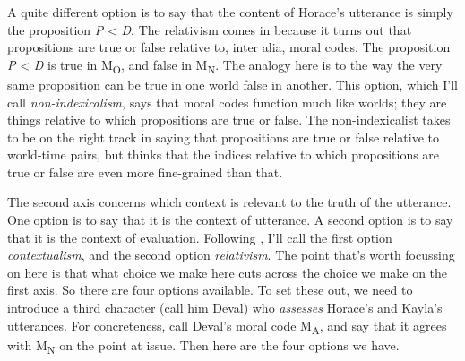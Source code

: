 A quite different option is to say that the content of Horace's utterance is simply the proposition \textit{P }{\textless}\textit{ D}. The relativism comes in because it turns out that propositions are true or false relative to, inter alia, moral codes. The proposition \textit{P }{\textless}\textit{ D} is true in M\textsubscript{O}, and false in M\textsubscript{N}. The analogy here is to the way the very same proposition can be true in one world false in another. This option, which I'll call \textit{non-indexicalism}, says that moral codes function much like worlds; they are things relative to which propositions are true or false. The non-indexicalist takes \cite{Kaplan1989} to be on the right track in saying that propositions are true or false relative to world-time pairs, but thinks that the indices relative to which propositions are true or false are even more fine-grained than that.

The second axis concerns which context is relevant to the truth of the utterance. One option is to say that it is the context of utterance. A second option is to say that it is the context of evaluation. Following \cite{MacFarlane2007-SMNIC, MacFarlane2009-MACNC}, I'll call the first option \textit{contextualism}, and the second option \textit{relativism}. The point that's worth focussing on here is that what choice we make here cuts across the choice we make on the first axis. So there are four options available. To set these out, we need to introduce a third character (call him Deval) who \textit{assesses} Horace's and Kayla's utterances. For concreteness, call Deval's moral code M\textsubscript{A}, and say that it agrees with M\textsubscript{N} on the point at issue. Then here are the four options we have.


